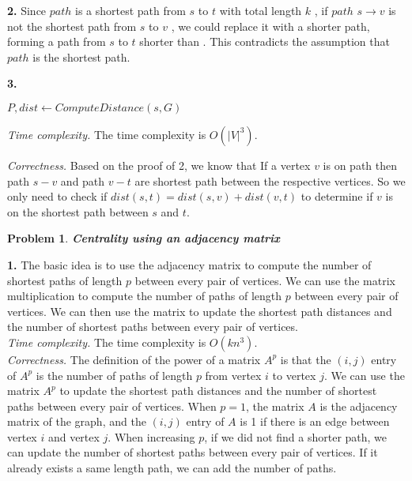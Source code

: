 \documentclass[11pt]{exam}
\newtheorem{problem}{Problem}
\let\oldtcc\tcc
\renewcommand{\tcc}[1]{{\color{olive}\oldtcc{#1}}}
\begin{document}
\noindent\textbf{2.}
Since  $path$  is a shortest path from  $s$  to  $t$  with total length  $k$ , if  $path$ {$s \to v$}  is not the shortest path from  $s$  to  $v$ , we could replace it with a shorter path, forming a path from  $s$  to  $t$  shorter than   . This contradicts the assumption that  $path$  is the shortest path.

\noindent\textbf{3.}


\begin{algorithm}[H]
    \caption{$ComputeBetweenness(G(V,E))$}
    $P, dist \gets ComputeDistance(s, G)$\;



    \;

\end{algorithm}

\noindent\textit{Time complexity.}
The time complexity is $O(|V|^3)$.

\noindent\textit{Correctness.}
Based on the proof of 2, we know that If a vertex $v$ is on path then path $s-v$ and path $v-t$ are shortest path between the respective vertices. So we only need to check if $dist(s,t) = dist(s,v) + dist(v,t)$ to determine if $v$ is on the shortest path between $s$ and $t$.



\newpage
\begin{problem}
    \textbf{Centrality using an adjacency matrix}
\end{problem}

\noindent\textbf{1.}
The basic idea is to use the adjacency matrix to compute the number of shortest paths of length $p$ between every pair of vertices. We can use the matrix multiplication to compute the number of paths of length $p$ between every pair of vertices. We can then use the matrix to update the shortest path distances and the number of shortest paths between every pair of vertices.\\


\noindent\textit{Time complexity.}
The time complexity is $O(kn^3)$.\\


\noindent\textit{Correctness.}
The definition of the power of a matrix $A^p$ is that the $(i,j)$ entry of $A^p$ is the number of paths of length $p$ from vertex $i$ to vertex $j$. We can use the matrix $A^p$ to update the shortest path distances and the number of shortest paths between every pair of vertices. When $p = 1$, the matrix $A$ is the adjacency matrix of the graph, and the $(i,j)$ entry of $A$ is 1 if there is an edge between vertex $i$ and vertex $j$. When increasing $p$, if we did not find a shorter path, we can update the number of shortest paths between every pair of vertices. If it already exists a same length path, we can add the number of paths.
\end{document}
